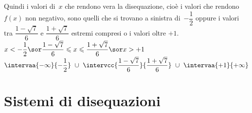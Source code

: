 \begin{esempio}{}{}
Quindi i valori di~\(x\) che rendono vera la disequazione, cioè 
i valori  che rendono~\(f(x)\) non negativo, sono quelli 
che si trovano a sinistra di~\(-\dfrac{1}{2}\) oppure 
i valori tra \(\dfrac{1 - \sqrt{7}}{6}\) e \(\dfrac{1 + \sqrt{7}}{6}\) 
estremi compresi o
i valori oltre \(+1\).\\
\inssol
  {\solfrazionec}
  {\(x < -\dfrac{1}{2} \sor 
  \dfrac{1 - \sqrt{7}}{6} \leqslant x \leqslant \dfrac{1 + \sqrt{7}}{6} 
  \sor x > +1\)}
  {\(\intervaa{-\infty}{-\dfrac{1}{2}}~\cup~
  \intervcc{\dfrac{1 - \sqrt{7}}{6}}{\dfrac{1 + \sqrt{7}}{6}}~\cup~
  \intervaa{+1}{+\infty}\)}
% 
% 
% 
% 
% 
\end{esempio}

% 

\section{Sistemi di disequazioni}
\label{sec:diseq_sistemi}

